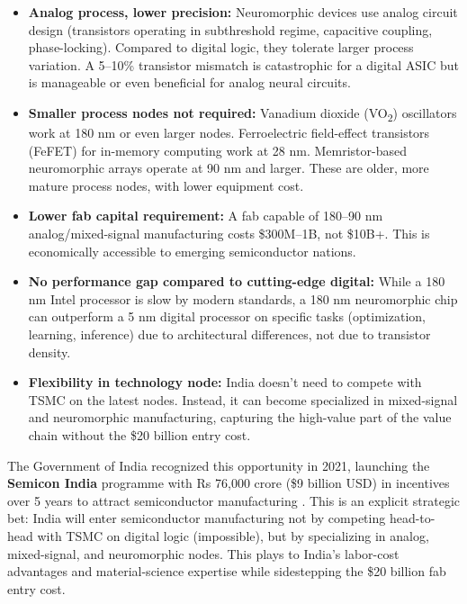 \begin{itemize}
\item \textbf{Analog process, lower precision:} Neuromorphic devices use analog circuit design (transistors operating in subthreshold regime, capacitive coupling, phase-locking). Compared to digital logic, they tolerate larger process variation. A 5--10\% transistor mismatch is catastrophic for a digital ASIC but is manageable or even beneficial for analog neural circuits.

\item \textbf{Smaller process nodes not required:} Vanadium dioxide (VO\textsubscript{2}) oscillators work at 180 nm or even larger nodes. Ferroelectric field-effect transistors (FeFET) for in-memory computing work at 28 nm. Memristor-based neuromorphic arrays operate at 90 nm and larger. These are older, more mature process nodes, with lower equipment cost.

\item \textbf{Lower fab capital requirement:} A fab capable of 180--90 nm analog/mixed-signal manufacturing costs \$300M--1B, not \$10B+. This is economically accessible to emerging semiconductor nations.

\item \textbf{No performance gap compared to cutting-edge digital:} While a 180 nm Intel processor is slow by modern standards, a 180 nm neuromorphic chip can outperform a 5 nm digital processor on specific tasks (optimization, learning, inference) due to architectural differences, not due to transistor density.

\item \textbf{Flexibility in technology node:} India doesn't need to compete with TSMC on the latest nodes. Instead, it can become specialized in mixed-signal and neuromorphic manufacturing, capturing the high-value part of the value chain without the \$20 billion entry cost.
\end{itemize}

The Government of India recognized this opportunity in 2021, launching the \textbf{Semicon India} programme with Rs 76,000 crore (\$9 billion USD) in incentives over 5 years to attract semiconductor manufacturing \cite{SemiconIndia2021}. This is an explicit strategic bet: India will enter semiconductor manufacturing not by competing head-to-head with TSMC on digital logic (impossible), but by specializing in analog, mixed-signal, and neuromorphic nodes. This plays to India's labor-cost advantages and material-science expertise while sidestepping the \$20 billion fab entry cost.

